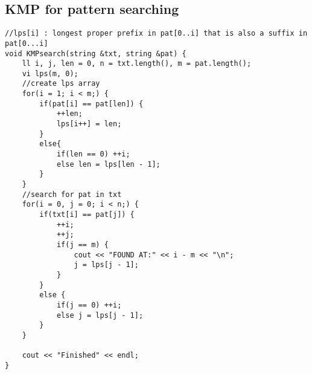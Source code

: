 \documentclass[a4paper]{article}
\begin{document}
\subsection*{KMP for pattern searching}
\begin{verbatim}
//lps[i] : longest proper prefix in pat[0..i] that is also a suffix in pat[0...i]
void KMPsearch(string &txt, string &pat) {
    ll i, j, len = 0, n = txt.length(), m = pat.length();
    vi lps(m, 0);
    //create lps array
    for(i = 1; i < m;) {
        if(pat[i] == pat[len]) {
            ++len;
            lps[i++] = len;
        }
        else{
            if(len == 0) ++i;
            else len = lps[len - 1];
        }
    }
    //search for pat in txt
    for(i = 0, j = 0; i < n;) {
        if(txt[i] == pat[j]) {
            ++i;
            ++j;
            if(j == m) {
                cout << "FOUND AT:" << i - m << "\n";
                j = lps[j - 1];
            }
        }
        else {
            if(j == 0) ++i;
            else j = lps[j - 1];
        }
    }
    
    cout << "Finished" << endl;
}

\end{verbatim}
\end{document}
